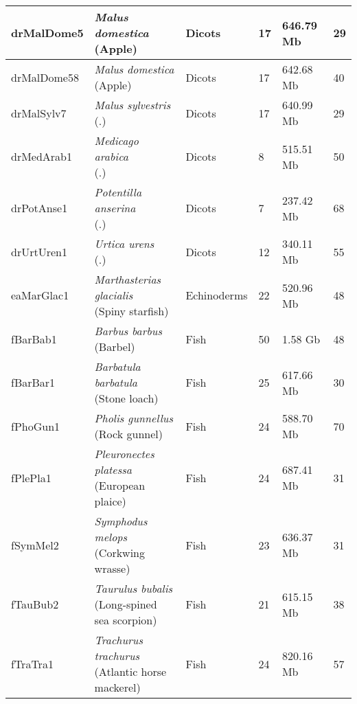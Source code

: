 \begin{centering}
\begin{longtable}{l|l|l|l|l|l}
drMalDome5 & \makecell[{l}]{\textit{Malus domestica} \\ (Apple)} & Dicots & 17 & 646.79 Mb & 29  \\ \hline
drMalDome58 & \makecell[{l}]{\textit{Malus domestica} \\ (Apple)} & Dicots & 17 & 642.68 Mb & 40  \\ \hline
drMalSylv7 & \makecell[{l}]{\textit{Malus sylvestris} \\ (.)} & Dicots & 17 & 640.99 Mb & 29  \\ \hline
drMedArab1 & \makecell[{l}]{\textit{Medicago arabica} \\ (.)} & Dicots & 8 & 515.51 Mb & 50  \\ \hline
drPotAnse1 & \makecell[{l}]{\textit{Potentilla anserina} \\ (.)} & Dicots & 7 & 237.42 Mb & 68  \\ \hline
drUrtUren1 & \makecell[{l}]{\textit{Urtica urens} \\ (.)} & Dicots & 12 & 340.11 Mb & 55  \\ \hline
eaMarGlac1 & \makecell[{l}]{\textit{Marthasterias glacialis} \\ (Spiny starfish)} & Echinoderms & 22 & 520.96 Mb & 48  \\ \hline
fBarBab1 & \makecell[{l}]{\textit{Barbus barbus} \\ (Barbel)} & Fish & 50 & 1.58 Gb & 48  \\ \hline
fBarBar1 & \makecell[{l}]{\textit{Barbatula barbatula} \\ (Stone loach)} & Fish & 25 & 617.66 Mb & 30  \\ \hline
fPhoGun1 & \makecell[{l}]{\textit{Pholis gunnellus} \\ (Rock gunnel)} & Fish & 24 & 588.70 Mb & 70  \\ \hline
fPlePla1 & \makecell[{l}]{\textit{Pleuronectes platessa} \\ (European plaice)} & Fish & 24 & 687.41 Mb & 31  \\ \hline
fSymMel2 & \makecell[{l}]{\textit{Symphodus melops} \\ (Corkwing wrasse)} & Fish & 23 & 636.37 Mb & 31  \\ \hline
fTauBub2 & \makecell[{l}]{\textit{Taurulus bubalis} \\ (Long-spined sea scorpion)} & Fish & 21 & 615.15 Mb & 38  \\ \hline
fTraTra1 & \makecell[{l}]{\textit{Trachurus trachurus} \\ (Atlantic horse mackerel)} & Fish & 24 & 820.16 Mb & 57  \\ \hline

\end{longtable}
\end{centering}
